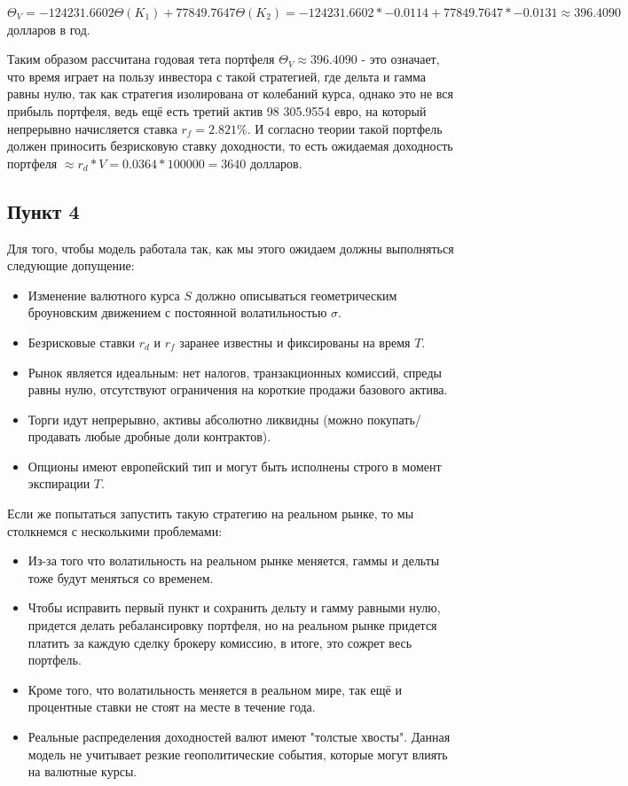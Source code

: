 \documentclass[a4paper]{article}
\theoremstyle{definition}
\begin{document}
    $\Theta_V = -124 231.6602 \Theta(K_1) + 77 849.7647 \Theta(K_2) = -124 231.6602 * -0.0114 + 77 849.7647 * -0.0131 \approx 396.4090$ долларов в год.

    Таким образом рассчитана годовая тета портфеля $\Theta_V \approx 396.4090$ - это означает, что время играет на пользу инвестора с такой стратегией, где дельта и гамма равны нулю, так как стратегия изолирована от колебаний
    курса, однако это не вся прибыль портфеля, ведь ещё есть третий актив 98 305.9554 евро, на который непрерывно начисляется ставка $r_f = 2.821\%$. 
    И согласно теории такой портфель должен приносить безрисковую ставку доходности, то есть ожидаемая доходность портфеля $\approx r_d * V = 0.0364 * 100 000 = 3640$ долларов.
    
\subsection{Пункт 4}
    Для того, чтобы модель работала так, как мы этого ожидаем должны выполняться следующие допущение:
    \begin{itemize}
        \item Изменение валютного курса $S$ должно описываться геометрическим броуновским движением с постоянной волатильностью $\sigma$.
        \item Безрисковые ставки $r_d$ и $r_f$ заранее известны и фиксированы на время $T$.
        \item Рынок является идеальным: нет налогов, транзакционных комиссий, спреды равны нулю, отсутствуют ограничения на короткие продажи базового актива.
        \item Торги идут непрерывно, активы абсолютно ликвидны (можно покупать/продавать любые дробные доли контрактов).
        \item Опционы имеют европейский тип и могут быть исполнены строго в момент экспирации $T$.
    \end{itemize} 

    Если же попытаться запустить такую стратегию на реальном рынке, то мы столкнемся с несколькими проблемами:
    \begin{itemize}
        \item Из-за того что волатильность на реальном рынке меняется, гаммы и дельты тоже будут меняться со временем.
        \item Чтобы исправить первый пункт и сохранить дельту и гамму равными нулю, придется делать ребалансировку портфеля, но на реальном рынке придется платить за каждую сделку брокеру комиссию, в итоге, это сожрет весь портфель.
        \item Кроме того, что волатильность меняется в реальном мире, так ещё и процентные ставки не стоят на месте в течение года.
        \item Реальные распределения доходностей валют имеют "толстые хвосты". Данная модель не учитывает резкие геополитические события, которые могут влиять на валютные курсы.
    \end{itemize}
\end{document}
